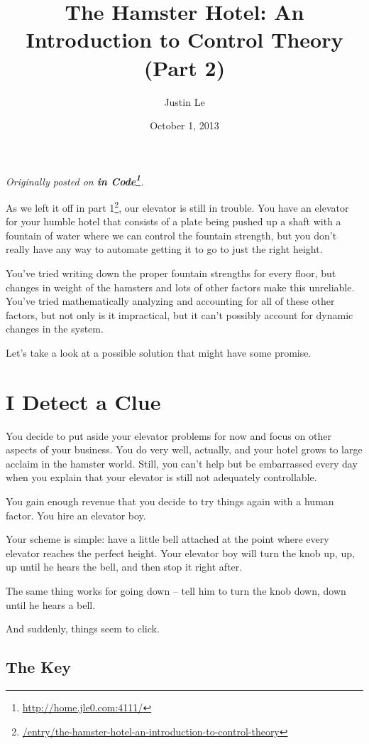 \documentclass[]{article}
\title{The Hamster Hotel: An Introduction to Control Theory (Part 2)}
\author{Justin Le}
\date{October 1, 2013}
\renewcommand{\href}[2]{#2\footnote{\url{#1}}}
\begin{document}
\maketitle

\emph{Originally posted on \textbf{\href{http://home.jle0.com:4111/}{in
Code}}.}

As we left it off in
\href{/entry/the-hamster-hotel-an-introduction-to-control-theory}{part
1}, our elevator is still in trouble. You have an elevator for your
humble hotel that consists of a plate being pushed up a shaft with a
fountain of water where we can control the fountain strength, but you
don't really have any way to automate getting it to go to just the right
height.

You've tried writing down the proper fountain strengths for every floor,
but changes in weight of the hamsters and lots of other factors make
this unreliable. You've tried mathematically analyzing and accounting
for all of these other factors, but not only is it impractical, but it
can't possibly account for dynamic changes in the system.

Let's take a look at a possible solution that might have some promise.

\section{I Detect a Clue}\label{i-detect-a-clue}

You decide to put aside your elevator problems for now and focus on
other aspects of your business. You do very well, actually, and your
hotel grows to large acclaim in the hamster world. Still, you can't help
but be embarrassed every day when you explain that your elevator is
still not adequately controllable.

You gain enough revenue that you decide to try things again with a human
factor. You hire an elevator boy.

Your scheme is simple: have a little bell attached at the point where
every elevator reaches the perfect height. Your elevator boy will turn
the knob up, up, up until he hears the bell, and then stop it right
after.

The same thing works for going down -- tell him to turn the knob down,
down until he hears a bell.

And suddenly, things seem to click.

\subsection{The Key}\label{the-key}
\end{document}
